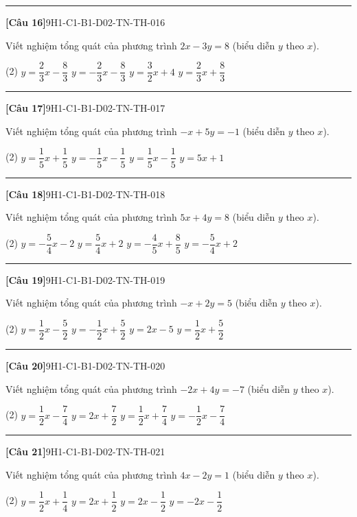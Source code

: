 \documentclass[12pt,a4paper]{article}
\newif\ifloigiai
\newenvironment{cauhoi}[2]{%
  \par\medskip\noindent\rule{\textwidth}{0.4pt}\par\nopagebreak
  \noindent\textbf{[#1]}\hfill{\scriptsize\ttfamily #2}\par\nopagebreak\smallskip}{\par}
\newcommand{\dapan}[1]{\ifloigiai\par\smallskip\noindent\textit{Đáp án:} \textbf{#1}\par\fi}
\begin{document}
\begin{cauhoi}{Câu 16}{9H1-C1-B1-D02-TN-TH-016}
Viết nghiệm tổng quát của phương trình $2x-3y=8$ (biểu diễn $y$ theo $x$).
\begin{tasks}(2)
\task $y=\dfrac{2}{3}x-\dfrac{8}{3}$
\task $y=-\dfrac{2}{3}x-\dfrac{8}{3}$
\task $y=\dfrac{3}{2}x+4$
\task $y=\dfrac{2}{3}x+\dfrac{8}{3}$
\end{tasks}
\dapan{A}
\end{cauhoi}
\begin{cauhoi}{Câu 17}{9H1-C1-B1-D02-TN-TH-017}
Viết nghiệm tổng quát của phương trình $-x+5y=-1$ (biểu diễn $y$ theo $x$).
\begin{tasks}(2)
\task $y=\dfrac{1}{5}x+\dfrac{1}{5}$
\task $y=-\dfrac{1}{5}x-\dfrac{1}{5}$
\task $y=\dfrac{1}{5}x-\dfrac{1}{5}$
\task $y=5x+1$
\end{tasks}
\dapan{C}
\end{cauhoi}
\begin{cauhoi}{Câu 18}{9H1-C1-B1-D02-TN-TH-018}
Viết nghiệm tổng quát của phương trình $5x+4y=8$ (biểu diễn $y$ theo $x$).
\begin{tasks}(2)
\task $y=-\dfrac{5}{4}x-2$
\task $y=\dfrac{5}{4}x+2$
\task $y=-\dfrac{4}{5}x+\dfrac{8}{5}$
\task $y=-\dfrac{5}{4}x+2$
\end{tasks}
\dapan{D}
\end{cauhoi}
\begin{cauhoi}{Câu 19}{9H1-C1-B1-D02-TN-TH-019}
Viết nghiệm tổng quát của phương trình $-x+2y=5$ (biểu diễn $y$ theo $x$).
\begin{tasks}(2)
\task $y=\dfrac{1}{2}x-\dfrac{5}{2}$
\task $y=-\dfrac{1}{2}x+\dfrac{5}{2}$
\task $y=2x-5$
\task $y=\dfrac{1}{2}x+\dfrac{5}{2}$
\end{tasks}
\dapan{D}
\end{cauhoi}
\begin{cauhoi}{Câu 20}{9H1-C1-B1-D02-TN-TH-020}
Viết nghiệm tổng quát của phương trình $-2x+4y=-7$ (biểu diễn $y$ theo $x$).
\begin{tasks}(2)
\task $y=\dfrac{1}{2}x-\dfrac{7}{4}$
\task $y=2x+\dfrac{7}{2}$
\task $y=\dfrac{1}{2}x+\dfrac{7}{4}$
\task $y=-\dfrac{1}{2}x-\dfrac{7}{4}$
\end{tasks}
\dapan{A}
\end{cauhoi}
\begin{cauhoi}{Câu 21}{9H1-C1-B1-D02-TN-TH-021}
Viết nghiệm tổng quát của phương trình $4x-2y=1$ (biểu diễn $y$ theo $x$).
\begin{tasks}(2)
\task $y=\dfrac{1}{2}x+\dfrac{1}{4}$
\task $y=2x+\dfrac{1}{2}$
\task $y=2x-\dfrac{1}{2}$
\task $y=-2x-\dfrac{1}{2}$
\end{tasks}
\dapan{C}
\end{cauhoi}
\end{document}

